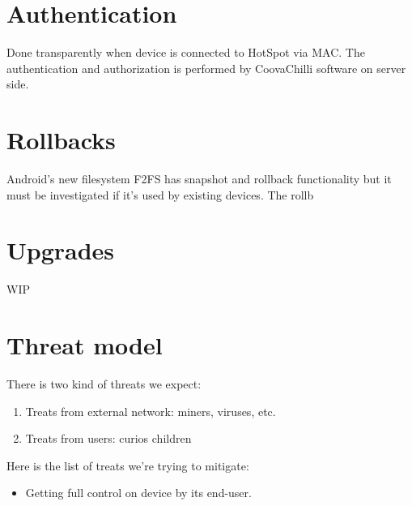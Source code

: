 \documentclass[a4paper]{report}
\begin{document}
\section{Authentication}

Done transparently when device is connected to HotSpot via MAC. The
authentication and authorization is performed by CoovaChilli software
on server side.


\section{Rollbacks}

Android's new filesystem F2FS has snapshot and rollback functionality
but it must be investigated if it's used by existing devices. The
rollb


\section{Upgrades}

WIP


\section{Threat model}

There is two kind of threats we expect:

\begin{enumerate}
\item Treats from external network: miners, viruses, etc.
\item Treats from users: curios children
\end{enumerate}

Here is the list of treats we're trying to mitigate:

\begin{itemize}
\item Getting full control on device by its end-user.
\end{itemize}
\end{document}
